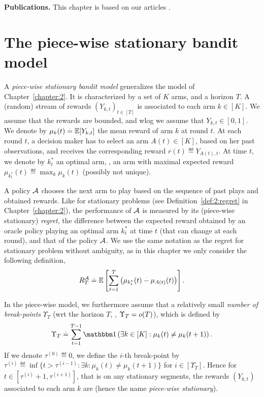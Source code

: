 \textbf{Publications.}
%
This chapter is based on our articles \cite{Besson2019GLRT,Besson2019Gretsi}.


\section{The piece-wise stationary bandit model}
\label{sec:6:BanditSetting}

A \emph{piece-wise stationary bandit model} generalizes the model of Chapter~\ref{chapter:2}.
It is characterized by a set of $K$ arms, and a horizon $T$.
A (random) stream of rewards $(Y_{k,t})_{t\in[T]}$ is associated to each arm $k \in [K]$.
We assume that the rewards are bounded, and wlog we assume that $Y_{k,t} \in [0,1]$.
We denote by $\mu_k(t) \overset{.}{=}  \mathbb{E}[Y_{k,t}]$ the mean reward of arm $k$ at round $t$.
At each round $t$, a decision maker has to select an arm $A(t)\in[K]$, based on her past observations, and receives the corresponding reward $r(t) \eqdef Y_{A(t),t}$.
At time $t$, we denote by $k_t^*$ an optimal arm, \ie, an arm with maximal expected reward $\mu_{k_t^*}(t) \eqdef \max_k \mu_k(t)$ (possibly not unique).

A policy $\mathcal{A}$ chooses the next arm to play based on the sequence of past plays and obtained rewards.
Like for stationary problems (see Definition~\ref{def:2:regret} in Chapter~\ref{chapter:2}), the performance of $\mathcal{A}$ is measured by its (piece-wise stationary) \emph{regret}, the difference between the expected reward obtained by an oracle policy playing an optimal arm $k_t^*$ at time $t$ (that can change at each round), and that of the policy $\mathcal{A}$.
We use the same notation as the regret for stationary problem without ambiguity, as in this chapter we only consider the following definition,
%
\begin{equation}\label{def:6:regret}
    R_T^{\mathcal{A}} \overset{.}{=} \mathbb{E}\left[\sum_{t=1}^T \left(\mu_{k_t^*}(t) - \mu_{A(t)}(t)\right)\right].
\end{equation}


In the piece-wise \iid{} model, we furthermore assume that a relatively small \emph{number of break-points} $\Upsilon_T$ (wrt the horizon $T$, \ie, $\Upsilon_T = \mathop{}\mathopen{}o\mathopen{}\left(T\right)$), which is defined by
\begin{equation}\label{def:6:break-points}
    \Upsilon_T \eqdef \sum_{t=1}^{T-1} \indic\left(\exists k\in[K]: \mu_k(t) \neq \mu_k(t+1)\right).
\end{equation}
If we denote $\tau^{(0)} \eqdef 0$, we define the $i$-th break-point by
$\tau^{(i)} \eqdef \inf\{t > \tau^{(i-1)} : \exists k : \mu_k(t) \neq \mu_k(t+1)\}$ for $i\in[\Upsilon_T]$.
%
Hence for $t\in[\tau^{(i)} + 1,\tau^{(i+1)}]$, that is on any stationary segments, the rewards $(Y_{k,t})$ associated to each arm $k$ are \iid{} (hence the name \emph{piece-wise stationary}).

